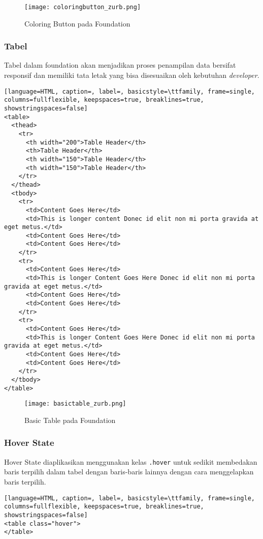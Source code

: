 \begin{figure} [H]
	\centering  
	\texttt{[image: coloringbutton\_zurb.png]}  
	\caption{Coloring Button pada Foundation}
\end{figure}

\subsubsection{Tabel}

Tabel dalam foundation akan menjadikan proses penampilan data bersifat responsif dan memiliki tata letak yang bisa disesuaikan oleh kebutuhan \textit{developer}.


\begin{lstlisting}[language=HTML, caption=, label=, basicstyle=\ttfamily, frame=single, columns=fullflexible, keepspaces=true, breaklines=true, showstringspaces=false]  
<table>
  <thead>
    <tr>
      <th width="200">Table Header</th>
      <th>Table Header</th>
      <th width="150">Table Header</th>
      <th width="150">Table Header</th>
    </tr>
  </thead>
  <tbody>
    <tr>
      <td>Content Goes Here</td>
      <td>This is longer content Donec id elit non mi porta gravida at eget metus.</td>
      <td>Content Goes Here</td>
      <td>Content Goes Here</td>
    </tr>
    <tr>
      <td>Content Goes Here</td>
      <td>This is longer Content Goes Here Donec id elit non mi porta gravida at eget metus.</td>
      <td>Content Goes Here</td>
      <td>Content Goes Here</td>
    </tr>
    <tr>
      <td>Content Goes Here</td>
      <td>This is longer Content Goes Here Donec id elit non mi porta gravida at eget metus.</td>
      <td>Content Goes Here</td>
      <td>Content Goes Here</td>
    </tr>
  </tbody>
</table>
\end{lstlisting}

\begin{figure} [H]
	\centering  
	\texttt{[image: basictable\_zurb.png]}  
	\caption{Basic Table pada Foundation}
\end{figure}

\subsubsection{Hover State}
Hover State diaplikasikan menggunakan kelas \texttt{.hover} untuk sedikit membedakan baris terpilih dalam tabel dengan baris-baris lainnya dengan cara menggelapkan baris terpilih.
\begin{lstlisting}[language=HTML, caption=, label=, basicstyle=\ttfamily, frame=single, columns=fullflexible, keepspaces=true, breaklines=true, showstringspaces=false] 
<table class="hover">
</table>
\end{lstlisting}

